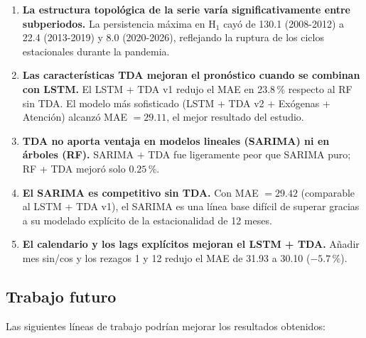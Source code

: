 \documentclass[12pt, a4paper]{article}
\begin{document}
\begin{enumerate}[leftmargin=1.5em]
  \item \textbf{La estructura topológica de la serie varía significativamente entre subperiodos.}
        La persistencia máxima en H$_1$ cayó de 130.1 (2008-2012) a 22.4 (2013-2019) y 8.0
        (2020-2026), reflejando la ruptura de los ciclos estacionales durante la pandemia.

  \item \textbf{Las características TDA mejoran el pronóstico cuando se combinan con LSTM.}
        El LSTM + TDA v1 redujo el MAE en 23.8\,\% respecto al RF sin TDA. El modelo más
        sofisticado (LSTM + TDA v2 + Exógenas + Atención) alcanzó MAE $= 29.11$, el mejor
        resultado del estudio.

  \item \textbf{TDA no aporta ventaja en modelos lineales (SARIMA) ni en árboles (RF).}
        SARIMA + TDA fue ligeramente peor que SARIMA puro; RF + TDA mejoró solo $0.25\,\%$.

  \item \textbf{El SARIMA es competitivo sin TDA.} Con MAE $= 29.42$ (comparable al LSTM + TDA v1),
        el SARIMA es una línea base difícil de superar gracias a su modelado explícito de la
        estacionalidad de 12 meses.

  \item \textbf{El calendario y los lags explícitos mejoran el LSTM + TDA.} Añadir mes
        sin/cos y los rezagos 1 y 12 redujo el MAE de 31.93 a 30.10 ($-5.7\,\%$).
\end{enumerate}

\subsection{Trabajo futuro}

Las siguientes líneas de trabajo podrían mejorar los resultados obtenidos:
\end{document}
